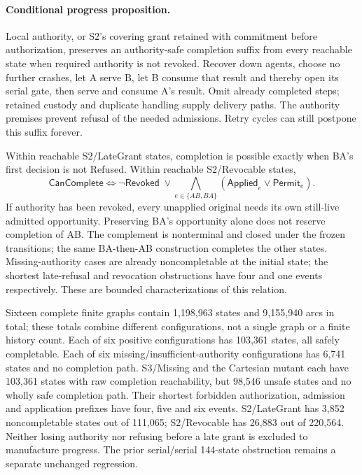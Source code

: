 \documentclass[11pt,a4paper]{article}
\theoremstyle{definition}
\theoremstyle{remark}
\begin{document}
\paragraph{Conditional progress proposition.} Local authority, or S2's covering grant retained with commitment before authorization, preserves an authority-safe completion suffix from every reachable state when required authority is not revoked. Recover down agents, choose no further crashes, let A serve B, let B consume that result and thereby open its serial gate, then serve and consume A's result. Omit already completed steps; retained custody and duplicate handling supply delivery paths. The authority premises prevent refusal of the needed admissions. Retry cycles can still postpone this suffix forever.

Within reachable S2/LateGrant states, completion is possible exactly when BA's first decision is not Refused. Within reachable S2/Revocable states,
\[\mathsf{CanComplete}\iff\neg\mathsf{Revoked}\;\lor\!\bigwedge_{e\in\{AB,BA\}}(\mathsf{Applied}_e\lor\mathsf{Permit}_e).\]
If authority has been revoked, every unapplied original needs its own still-live admitted opportunity. Preserving BA's opportunity alone does not reserve completion of AB. The complement is nonterminal and closed under the frozen transitions; the same BA-then-AB construction completes the other states. Missing-authority cases are already noncompletable at the initial state; the shortest late-refusal and revocation obstructions have four and one events respectively. These are bounded characterizations of this relation.

Sixteen complete finite graphs contain 1,198,963 states and 9,155,940 arcs in total; these totals combine different configurations, not a single graph or a finite history count. Each of six positive configurations has 103,361 states, all safely completable. Each of six missing/insufficient-authority configurations has 6,741 states and no completion path. S3/Missing and the Cartesian mutant each have 103,361 states with raw completion reachability, but 98,546 unsafe states and no wholly safe completion path. Their shortest forbidden authorization, admission and application prefixes have four, five and six events. S2/LateGrant has 3,852 noncompletable states out of 111,065; S2/Revocable has 26,883 out of 220,564. Neither losing authority nor refusing before a late grant is excluded to manufacture progress. The prior serial/serial 144-state obstruction remains a separate unchanged regression.
\end{document}
